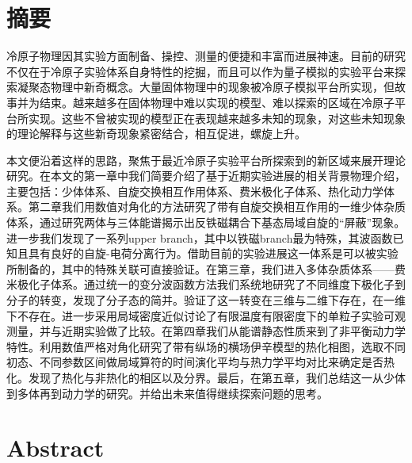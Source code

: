 \maketitle%
\MAKETITLE%
\makedeclaration%
\intobmk\chapter*{摘\quad 要}%
\setcounter{page}{1}%

冷原子物理因其实验方面制备、操控、测量的便捷和丰富而进展神速。目前的研究不仅在于冷原子实验体系自身特性的挖掘，而且可以作为量子模拟的实验平台来探索凝聚态物理中新奇概念。大量固体物理中的现象被冷原子模拟平台所实现，但故事并为结束。越来越多在固体物理中难以实现的模型、难以探索的区域在冷原子平台所实现。这些不曾被实现的模型正在表现越来越多未知的现象，对这些未知现象的理论解释与这些新奇现象紧密结合，相互促进，螺旋上升。

本文便沿着这样的思路，聚焦于最近冷原子实验平台所探索到的新区域来展开理论研究。在本文的第一章中我们简要介绍了基于近期实验进展的相关背景物理介绍，主要包括：少体体系、自旋交换相互作用体系、费米极化子体系、热化动力学体系。第二章我们用数值对角化的方法研究了带有自旋交换相互作用的一维少体杂质体系，通过研究两体与三体能谱揭示出反铁磁耦合下基态局域自旋的“屏蔽”现象。进一步我们发现了一系列upper branch，其中以铁磁branch最为特殊，其波函数已知且具有良好的自旋-电荷分离行为。借助目前的实验进展这一体系是可以被实验所制备的，其中的特殊关联可直接验证。在第三章，我们进入多体杂质体系——费米极化子体系。通过统一的变分波函数方法我们系统地研究了不同维度下极化子到分子的转变，发现了分子态的简并。验证了这一转变在三维与二维下存在，在一维下不存在。进一步采用局域密度近似讨论了有限温度有限密度下的单粒子实验可观测量，并与近期实验做了比较。在第四章我们从能谱静态性质来到了非平衡动力学特性。利用数值严格对角化研究了带有纵场的横场伊辛模型的热化相图，选取不同初态、不同参数区间做局域算符的时间演化平均与热力学平均对比来确定是否热化。发现了热化与非热化的相区以及分界。最后，在第五章，我们总结这一从少体到多体再到动力学的研究。并给出未来值得继续探索问题的思考。



\intobmk\chapter*{Abstract}%

